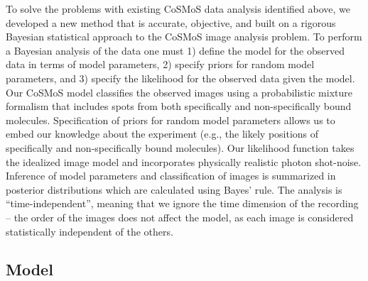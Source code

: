 To solve the problems with existing CoSMoS data analysis identified above, we developed a new method that is accurate, objective, and built on a rigorous Bayesian statistical approach to the CoSMoS image analysis problem. To perform a Bayesian analysis of the data one must 1) define the model for the observed data in terms of model parameters, 2) specify priors for random model parameters, and 3) specify the likelihood for the observed data given the model. Our CoSMoS model classifies the observed images using a probabilistic mixture formalism that includes spots from both specifically and non-specifically bound molecules. Specification of priors for random model parameters allows us to embed our knowledge about the experiment (e.g., the likely positions of specifically and non-specifically bound molecules). Our likelihood function takes the idealized image model and incorporates physically realistic photon shot-noise. Inference of model parameters and classification of images is summarized in posterior distributions which are calculated using Bayes' rule. The analysis is “time-independent”, meaning that we ignore the time dimension of the recording -- the order of the images does not affect the model, as each image is considered statistically independent of the others. 

\subsection*{Model} %

